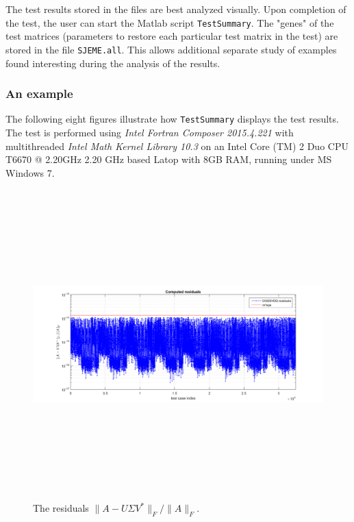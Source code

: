 \documentclass[12pt, a4paper, final]{article}
\numberwithin{equation}{section}
\begin{document}
\noindent The test results stored in the files are best analyzed visually. Upon completion of the test, the user can start the Matlab script \texttt{TestSummary}. The "genes" of the test matrices (parameters to restore each particular test matrix in the test) are stored in the file \texttt{SJEME.all}. This allows additional separate study of examples found interesting during the analysis of the results. 

\subsubsection{An example}\label{EX}
The following eight figures illustrate how  \texttt{TestSummary}
displays the test results. The test is performed using \emph{Intel\textregistered{} Fortran Composer 2015.4.221} with multithreaded \emph{Intel\textregistered{} Math Kernel Library 10.3} on an  Intel\textregistered{} Core (TM) 2 Duo CPU T6670 @ 2.20GHz 2.20 GHz based Latop with 8GB RAM, running under MS Windows 7. 

\begin{figure}[h]
	\begin{center}
		\includegraphics[width=6.3in,height=4.7in]{Fig1.png}
	\end{center}	
	\caption{ \label{fig:1} The residuals $\|A-U\Sigma V^*\|_F / \|A\|_F$.}
\end{figure} 
\end{document}
